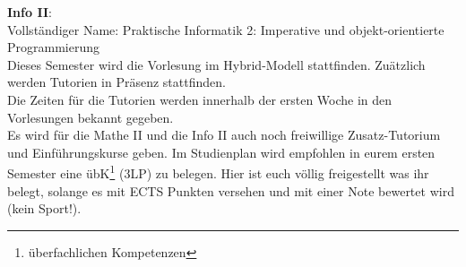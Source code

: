 \textbf{Info II}:\\
Vollständiger Name: Praktische Informatik 2: Imperative und objekt-orientierte Programmierung\\
Dieses Semester wird die Vorlesung im Hybrid-Modell stattfinden. Zuätzlich werden Tutorien in Präsenz stattfinden.\\

Die Zeiten für die Tutorien werden innerhalb der ersten Woche in den Vorlesungen bekannt gegeben.\\
Es wird für die Mathe II und die Info II auch noch freiwillige Zusatz-Tutorium und Einführungskurse geben. 
Im Studienplan wird empfohlen in eurem ersten Semester eine übK\footnote{überfachlichen Kompetenzen} (3LP) zu belegen. Hier ist euch völlig freigestellt was ihr belegt, solange es mit ECTS Punkten versehen und mit einer Note bewertet wird (kein Sport!).
